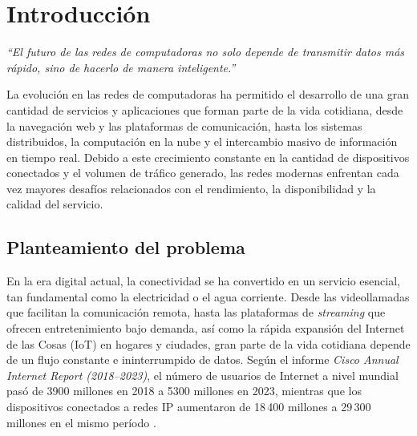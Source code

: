 \documentclass[12pt]{report}
\begin{document}
\clearpage

\chapter{Introducción}

\vspace{0.5cm}

\begin{flushright}
\textit{“El futuro de las redes de computadoras no solo depende de transmitir datos más rápido, sino de hacerlo de manera inteligente.”}
\end{flushright}

\vspace{0.5cm}

La evolución en las redes de computadoras ha permitido el desarrollo de una gran cantidad de servicios y aplicaciones que forman parte de la vida cotidiana,
desde la navegación web y las plataformas de comunicación, hasta los sistemas distribuidos, la computación en la nube y el intercambio masivo de información en 
tiempo real. Debido a este crecimiento constante en la cantidad de dispositivos conectados y el volumen de tráfico generado, las redes modernas enfrentan cada 
vez mayores desafíos relacionados con el rendimiento, la disponibilidad y la calidad del servicio.

\section{Planteamiento del problema}
\label{sec:planteamiento}
En la era digital actual, la conectividad se ha convertido en un servicio esencial, tan fundamental como la electricidad o el agua corriente. Desde las videollamadas que facilitan la comunicación remota, hasta las plataformas de \textit{streaming} que ofrecen entretenimiento bajo demanda, 
así como la rápida expansión del Internet de las Cosas (IoT) en hogares y ciudades, gran parte de la vida cotidiana depende de un flujo constante e ininterrumpido de datos. Según el informe \textit{Cisco Annual Internet Report (2018--2023)}, el número de usuarios de Internet a nivel mundial 
pasó de 3900 millones en 2018 a 5300 millones en 2023, mientras que los dispositivos conectados a redes IP aumentaron de 18\,400 millones a 29\,300 millones en el mismo período \cite{cisco2020}.
\end{document}
